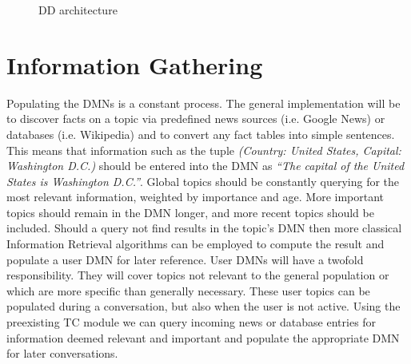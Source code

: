 \documentclass[10pt,twoside,twocolumn]{article}
\begin{document}
\begin{figure}
    \centering
    
    \label{DDdesign}
    \caption{DD architecture}
\end{figure}

\section{Information Gathering \label{section_info}}
Populating the DMNs is a constant process. The general implementation will be to discover facts on a topic via predefined news sources (i.e. Google News) or databases (i.e. Wikipedia) and to convert any fact tables into simple sentences. This means that information such as the tuple \emph{(Country: United States, Capital: Washington D.C.)} should be entered into the DMN as \emph{``The capital of the United States is Washington D.C.''}. Global topics should be constantly querying for the most relevant information, weighted by importance and age. More important topics should remain in the DMN longer, and more recent topics should be included. Should a query not find results in the topic's DMN then more classical Information Retrieval algorithms can be employed to compute the result and populate a user DMN for later reference. User DMNs will have a twofold responsibility. They will cover topics not relevant to the general population or which are more specific than generally necessary.
These user topics can be populated during a conversation, but also when the user is not active. Using the preexisting TC module we can query incoming news or database entries for information deemed relevant and important and populate the appropriate DMN for later conversations. 


 
\end{document}
